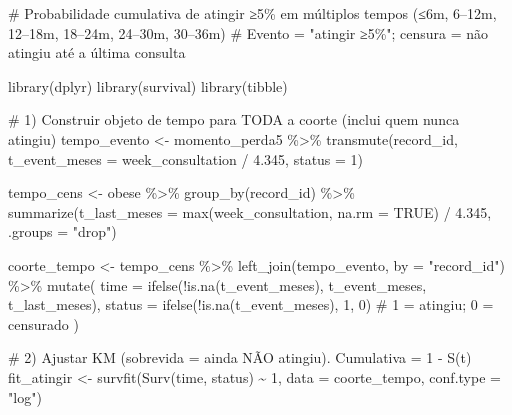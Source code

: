 \documentclass[
]{article}
\newenvironment{Shaded}{\begin{snugshade}}{\end{snugshade}}
\newcommand{\AttributeTok}[1]{\textcolor[rgb]{0.40,0.45,0.13}{#1}}
\newcommand{\CommentTok}[1]{\textcolor[rgb]{0.37,0.37,0.37}{#1}}
\newcommand{\ConstantTok}[1]{\textcolor[rgb]{0.56,0.35,0.01}{#1}}
\newcommand{\DecValTok}[1]{\textcolor[rgb]{0.68,0.00,0.00}{#1}}
\newcommand{\FloatTok}[1]{\textcolor[rgb]{0.68,0.00,0.00}{#1}}
\newcommand{\FunctionTok}[1]{\textcolor[rgb]{0.28,0.35,0.67}{#1}}
\newcommand{\NormalTok}[1]{\textcolor[rgb]{0.00,0.23,0.31}{#1}}
\newcommand{\OtherTok}[1]{\textcolor[rgb]{0.00,0.23,0.31}{#1}}
\newcommand{\SpecialCharTok}[1]{\textcolor[rgb]{0.37,0.37,0.37}{#1}}
\newcommand{\StringTok}[1]{\textcolor[rgb]{0.13,0.47,0.30}{#1}}
\begin{document}
\begin{Shaded}
\begin{Highlighting}[]
\CommentTok{\# Probabilidade cumulativa de atingir ≥5\% em múltiplos tempos (≤6m, 6–12m, 12–18m, 18–24m, 24–30m, 30–36m)}
\CommentTok{\# Evento = "atingir ≥5\%"; censura = não atingiu até a última consulta}

\FunctionTok{library}\NormalTok{(dplyr)}
\FunctionTok{library}\NormalTok{(survival)}
\FunctionTok{library}\NormalTok{(tibble)}

\CommentTok{\# 1) Construir objeto de tempo para TODA a coorte (inclui quem nunca atingiu)}
\NormalTok{tempo\_evento }\OtherTok{\textless{}{-}}\NormalTok{ momento\_perda5 }\SpecialCharTok{\%\textgreater{}\%}
  \FunctionTok{transmute}\NormalTok{(record\_id, }\AttributeTok{t\_event\_meses =}\NormalTok{ week\_consultation }\SpecialCharTok{/} \FloatTok{4.345}\NormalTok{, }\AttributeTok{status =} \DecValTok{1}\NormalTok{)}

\NormalTok{tempo\_cens }\OtherTok{\textless{}{-}}\NormalTok{ obese }\SpecialCharTok{\%\textgreater{}\%}
  \FunctionTok{group\_by}\NormalTok{(record\_id) }\SpecialCharTok{\%\textgreater{}\%}
  \FunctionTok{summarize}\NormalTok{(}\AttributeTok{t\_last\_meses =} \FunctionTok{max}\NormalTok{(week\_consultation, }\AttributeTok{na.rm =} \ConstantTok{TRUE}\NormalTok{) }\SpecialCharTok{/} \FloatTok{4.345}\NormalTok{, }\AttributeTok{.groups =} \StringTok{"drop"}\NormalTok{)}

\NormalTok{coorte\_tempo }\OtherTok{\textless{}{-}}\NormalTok{ tempo\_cens }\SpecialCharTok{\%\textgreater{}\%}
  \FunctionTok{left\_join}\NormalTok{(tempo\_evento, }\AttributeTok{by =} \StringTok{"record\_id"}\NormalTok{) }\SpecialCharTok{\%\textgreater{}\%}
  \FunctionTok{mutate}\NormalTok{(}
    \AttributeTok{time   =} \FunctionTok{ifelse}\NormalTok{(}\SpecialCharTok{!}\FunctionTok{is.na}\NormalTok{(t\_event\_meses), t\_event\_meses, t\_last\_meses),}
    \AttributeTok{status =} \FunctionTok{ifelse}\NormalTok{(}\SpecialCharTok{!}\FunctionTok{is.na}\NormalTok{(t\_event\_meses), }\DecValTok{1}\NormalTok{, }\DecValTok{0}\NormalTok{)  }\CommentTok{\# 1 = atingiu; 0 = censurado}
\NormalTok{  )}

\CommentTok{\# 2) Ajustar KM (sobrevida = ainda NÃO atingiu). Cumulativa = 1 {-} S(t)}
\NormalTok{fit\_atingir }\OtherTok{\textless{}{-}} \FunctionTok{survfit}\NormalTok{(}\FunctionTok{Surv}\NormalTok{(time, status) }\SpecialCharTok{\textasciitilde{}} \DecValTok{1}\NormalTok{, }\AttributeTok{data =}\NormalTok{ coorte\_tempo, }\AttributeTok{conf.type =} \StringTok{"log"}\NormalTok{)}


\end{Highlighting}
\end{Shaded}
\end{document}
